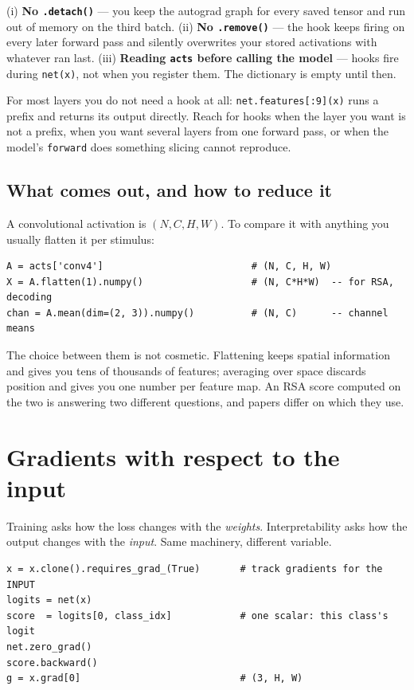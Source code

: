\documentclass[11pt]{article}
\begin{document}
\begin{keybox}
(i) \textbf{No \texttt{.detach()}} --- you keep the autograd graph for every
saved tensor and run out of memory on the third batch.
(ii) \textbf{No \texttt{.remove()}} --- the hook keeps firing on every later
forward pass and silently overwrites your stored activations with whatever ran
last.
(iii) \textbf{Reading \texttt{acts} before calling the model} --- hooks fire
during \texttt{net(x)}, not when you register them. The dictionary is empty
until then.
\end{keybox}

For most layers you do not need a hook at all: \texttt{net.features[:9](x)} runs
a prefix and returns its output directly. Reach for hooks when the layer you
want is not a prefix, when you want several layers from one forward pass, or
when the model's \texttt{forward} does something slicing cannot reproduce.

\subsection{What comes out, and how to reduce it}

A convolutional activation is $(N, C, H, W)$. To compare it with anything you
usually flatten it per stimulus:

\begin{lstlisting}
A = acts['conv4']                          # (N, C, H, W)
X = A.flatten(1).numpy()                   # (N, C*H*W)  -- for RSA, decoding
chan = A.mean(dim=(2, 3)).numpy()          # (N, C)      -- channel means
\end{lstlisting}

The choice between them is not cosmetic. Flattening keeps spatial information
and gives you tens of thousands of features; averaging over space discards
position and gives you one number per feature map. An RSA score computed on the
two is answering two different questions, and papers differ on which they use.

\section{Gradients with respect to the input}

Training asks how the loss changes with the \emph{weights}. Interpretability
asks how the output changes with the \emph{input}. Same machinery, different
variable.

\begin{lstlisting}
x = x.clone().requires_grad_(True)       # track gradients for the INPUT
logits = net(x)
score  = logits[0, class_idx]            # one scalar: this class's logit
net.zero_grad()
score.backward()
g = x.grad[0]                            # (3, H, W)
\end{lstlisting}
\end{document}
